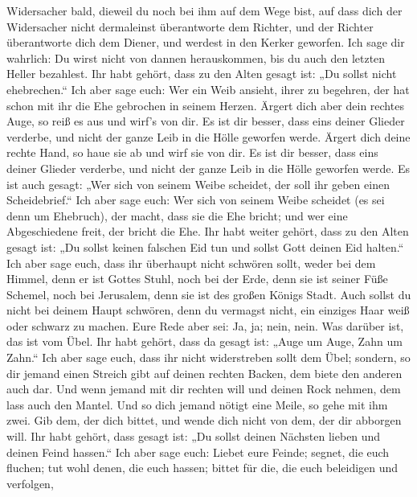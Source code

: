 Widersacher bald, dieweil du noch bei ihm auf dem Wege bist, auf dass
dich der Widersacher nicht dermaleinst überantworte dem Richter, und der
Richter überantworte dich dem Diener, und werdest in den Kerker
geworfen.  Ich sage dir wahrlich: Du wirst nicht von dannen
herauskommen, bis du auch den letzten Heller bezahlest. 
Ihr habt gehört, dass zu den Alten gesagt ist: „Du sollst nicht
ehebrechen.``  Ich aber sage euch: Wer ein Weib ansieht,
ihrer zu begehren, der hat schon mit ihr die Ehe gebrochen in seinem
Herzen.  Ärgert dich aber dein rechtes Auge, so reiß es aus
und wirf's von dir. Es ist dir besser, dass eins deiner Glieder
verderbe, und nicht der ganze Leib in die Hölle geworfen werde.
 Ärgert dich deine rechte Hand, so haue sie ab und wirf sie
von dir. Es ist dir besser, dass eins deiner Glieder verderbe, und nicht
der ganze Leib in die Hölle geworfen werde.  Es ist auch
gesagt: „Wer sich von seinem Weibe scheidet, der soll ihr geben einen
Scheidebrief.``  Ich aber sage euch: Wer sich von seinem
Weibe scheidet (es sei denn um Ehebruch), der macht, dass sie die Ehe
bricht; und wer eine Abgeschiedene freit, der bricht die Ehe.
 Ihr habt weiter gehört, dass zu den Alten gesagt ist: „Du
sollst keinen falschen Eid tun und sollst Gott deinen Eid halten.``
 Ich aber sage euch, dass ihr überhaupt nicht schwören
sollt, weder bei dem Himmel, denn er ist Gottes Stuhl, 
noch bei der Erde, denn sie ist seiner Füße Schemel, noch bei Jerusalem,
denn sie ist des großen Königs Stadt.  Auch sollst du nicht
bei deinem Haupt schwören, denn du vermagst nicht, ein einziges Haar
weiß oder schwarz zu machen.  Eure Rede aber sei: Ja, ja;
nein, nein. Was darüber ist, das ist vom Übel.  Ihr habt
gehört, dass da gesagt ist: „Auge um Auge, Zahn um Zahn.`` 
Ich aber sage euch, dass ihr nicht widerstreben sollt dem Übel; sondern,
so dir jemand einen Streich gibt auf deinen rechten Backen, dem biete
den anderen auch dar.  Und wenn jemand mit dir rechten will
und deinen Rock nehmen, dem lass auch den Mantel.  Und so
dich jemand nötigt eine Meile, so gehe mit ihm zwei.  Gib
dem, der dich bittet, und wende dich nicht von dem, der dir abborgen
will.  Ihr habt gehört, dass gesagt ist: „Du sollst deinen
Nächsten lieben und deinen Feind hassen.``  Ich aber sage
euch: Liebet eure Feinde; segnet, die euch fluchen; tut wohl denen, die
euch hassen; bittet für die, die euch beleidigen und verfolgen,
